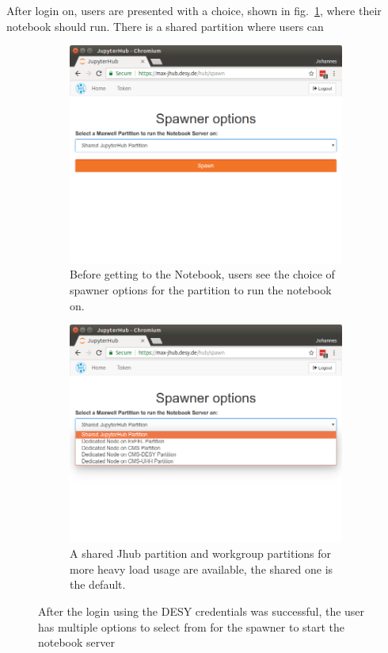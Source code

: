 \documentclass[10pt]{scrartcl}
\begin{document}
After login on, users are presented with a choice, shown in
fig.~\ref{fig:jhub_spawn}, where their notebook should run. There is a shared
partition where users can
%
\begin{figure}
  \centering
    \begin{subfigure}{0.45\textwidth} %
	  \includegraphics[width=\textwidth]{figures/jhub004.png}
	  \caption{Before getting to the Notebook, users see the choice of spawner options for the partition to run the notebook on.} %
  \end{subfigure}
  \vspace{1em} %
  \begin{subfigure}{0.45\textwidth} %
	  \includegraphics[width=\textwidth]{figures/jhub005.png}
	  \caption{A shared Jhub partition and workgroup partitions for more heavy load usage are available, the shared one is the default.} %
  \end{subfigure}
  \caption{After the login using the DESY credentials was successful, the user has multiple options to select from for the spawner to start the notebook server}
  \label{fig:jhub_spawn}
\end{figure}
\end{document}
